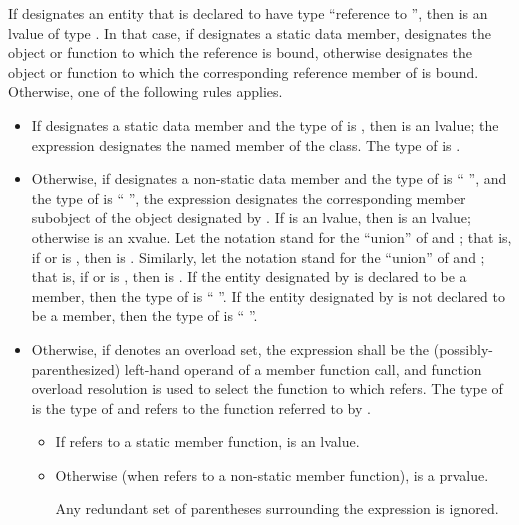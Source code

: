 \pnum
If  designates an entity
that is declared to have type ``reference to '', then
 is an lvalue of type .
In that case, if  designates a static data member,
 designates the object or function to which
the reference is bound,
otherwise  designates the object or function to which
the corresponding reference member of  is bound.
Otherwise, one of the following rules applies.
\begin{itemize}
\item
If  designates a static data member and the type of 
is , then  is an lvalue; the expression designates
the named member of the class. The type of  is .

\item
Otherwise, if  designates a non-static data member and the type of
 is `` '', and the type of 
is `` '', the expression designates the corresponding
member subobject of the object designated by . If 
is an lvalue, then  is an lvalue;
otherwise  is an xvalue.
Let the notation  stand for the ``union'' of
 and ; that is, if  or 
is , then  is . Similarly,
let the notation  stand for the ``union'' of 
and ; that is, if  or  is
, then  is .
If the entity designated by 
is declared to be a  member,
then the type of  is `` ''.
If the entity designated by 
is not declared to be a  member,
then the type of  is ``  ''.

\item
Otherwise, if  denotes an overload set,
the expression shall be the (possibly-parenthesized) left-hand operand of
a member function call, and
function overload resolution
is used to select the function to which  refers.
The type of  is the type of 
and  refers to the function referred to by .
\begin{itemize}
\item
If  refers to a static member function,
 is an lvalue.
\item
Otherwise (when  refers to a non-static member function),
 is a prvalue.
\begin{note}
Any redundant set of parentheses surrounding the expression
is ignored.
\end{note}
\end{itemize}


\end{itemize}
